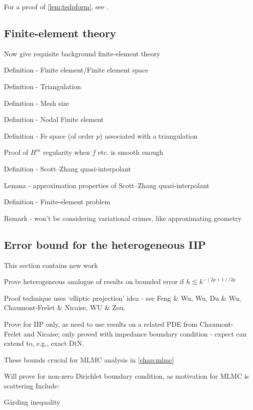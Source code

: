For a proof of \cref{lem:tedpform}, see \cite[Lemma A.7]{GrPeSp:19}.
  
\subsection{Finite-element theory}\label{sec:fetheory}

Now give requisite background finite-element theory

\bit
\item Definition - Finite element/Finite element space
\item Definition - Triangulation
\item Definition - Mesh size
\item Definition - Nodal Finite element
\item Definition - Fe space (of order $p$) associated with a triangulation
\item Proof of $H^m$ regularity when $f$ etc. is smooth enough
\item Definition - Scott--Zhang quasi-interpolant
\item Lemma - approximation properties of Scott--Zhang quasi-interpolant
\item Definition - Finite-element problem
\item Remark - won't be considering variational crimes, like approximating geometry
\eit

\subsection{Error bound for the heterogeneous IIP}\label{sec:errbound}
\bit
\item This section contains new work
\item Prove heterogeneous analogue of results on bounded error if $h \lesssim k^{-(2p+1)/2p}$
\item Proof technique uses `elliptic projection' idea - see Feng \& Wu, Wu, Du \& Wu, Chaumont-Frelet \& Nicaise, WU \& Zou.
\item Prove for IIP only, as need to use results on a related PDE from Chaumont-Frelet and Nicaise; only proved with impedance boundary condition - expect can extend to, e.g., exact DtN.
\item These bounds crucial for MLMC analysis in \cref{chap:mlmc}
\item Will prove for non-zero Dirichlet boundary condition, as motivation for MLMC is scattering
  \eit
  Include:
  \bit
\item G\r{a}rding inequality
  \eit


